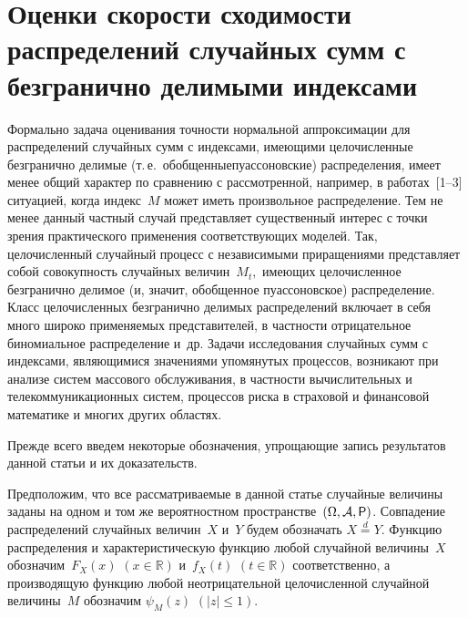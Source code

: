       \begin{multicols}{2}

      \label{st\stat}




\section{Оценки скорости сходимости распределений случайных сумм с безгранично делимыми индексами}

Формально задача оценивания точности нормальной аппроксимации для
распределений случайных сумм с индексами, имеющими це\-ло\-чис\-ленные
безгранично делимые (т.\,е.\ обобщенные\linebreak пуассоновские)
распределения, имеет менее общий характер по сравнению с
рассмотренной, например, в работах~[1--3]
ситуацией, когда индекс~$M$ может иметь произвольное
распределение. Тем не менее данный частный случай представляет
существенный интерес с точки зрения практического применения
соответствующих моделей. Так, целочисленный случайный процесс с
независимыми приращениями представляет собой совокупность
случайных величин~$M_t,$ имеющих целочисленное безгранично делимое
(и, значит, обобщенное пуассоновское) распределение. Класс
целочисленных безгранично делимых распределений включает в себя
много широко применяемых представителей, в частности отрицательное
биномиальное распределение и~др. Задачи исследования случайных
сумм с индексами, являющимися значениями упомянутых процессов,
возникают при анализе систем массового обслуживания, в частности
вычислительных и телекоммуникационных систем, процессов риска в
страховой и финансовой математике и многих других областях.

Прежде всего введем некоторые обозначения, упрощающие запись
результатов данной статьи и их доказательств.

Предположим, что все рассматриваемые в данной статье случайные
величины заданы на одном и том же вероятностном пространстве~$(\Omega,\mathcal{A},{\sf P})$. 
Сов\-па\-де\-ние распределений случайных
величин~$X$ и~$Y$ будем обозначать $X \stackrel{d}{=} Y$. Функцию
распределения и характеристическую функцию любой случайной
величины~$X$ обозначим~$F_X(x)$ $(x\in\mathbb{R})$ и~$f_X(t)$
$(t\in \mathbb{R})$ соответственно, а производящую функцию любой
неотрицательной целочисленной случайной величины~$M$ обозначим
$\psi_M(z)$ $(|z|\leqslant 1)$.


\end{multicols}
